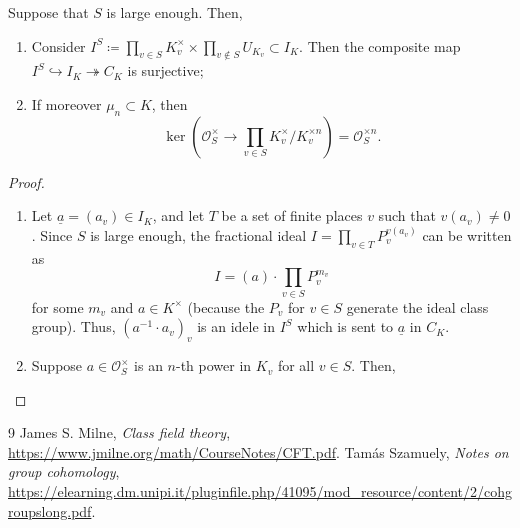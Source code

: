 \documentclass{article}
\begin{document}
\begin{lem}
		Suppose that $S$ is large enough. Then,
		\begin{enumerate}
				\item Consider $I^S\coloneqq \prod_{v\in S} K_v^\times \times \prod_{v\notin S} U_{K_v} \subset I_K$. Then the composite map $I^S \hookrightarrow I_K \twoheadrightarrow C_K$ is surjective;
				\item If moreover $\mu_n \subset K$, then 
				\[
					\ker\left(\mathcal{O}_S^\times \to \prod_{v\in S} K_v^\times / K_v^{\times n}\right) = \mathcal{O}_S^{\times n}.
				\]
		\end{enumerate}
\end{lem}
\begin{proof}\
		\begin{enumerate}
				\item Let $\underline{a}=(a_v)\in I_K$, and let $T$ be a set of finite places $v$ such that $v(a_v)\neq 0$. Since $S$ is large enough, the fractional ideal $I=\prod_{v\in T}P_v^{v(a_v)}$ can be written as
				\[
					I=(a)\cdot \prod_{v\in S} P_v^{m_v}	
				\]
				for some $m_v$ and $a\in K^\times$ (because the $P_v$ for $v\in S$ generate the ideal class group). Thus, $(a^{-1}\cdot a_v)_v$ is an idele in $I^S$ which is sent to $\underline{a}$ in $C_K$.
				\item Suppose $a\in \mathcal{O}_S^\times$ is an $n$-th power in $K_v$ for all $v\in S$. Then, 
		\end{enumerate}
\end{proof}
	

\begin{thebibliography}{9}
	 James S. Milne, \emph{Class field theory}, \url{https://www.jmilne.org/math/CourseNotes/CFT.pdf}.
	\bibitem{groupcohom} Tam\'as Szamuely, \emph{Notes on group cohomology}, \url{https://elearning.dm.unipi.it/pluginfile.php/41095/mod_resource/content/2/cohgroupslong.pdf}.
\end{thebibliography}
\end{document}
